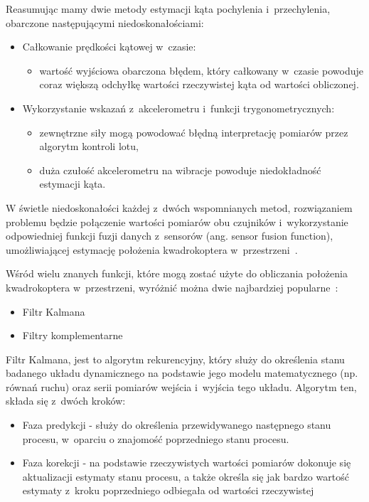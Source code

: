 \documentclass[11pt, twoside]{Thesis} %
\begin{document}
Reasumując mamy dwie metody estymacji kąta pochylenia i~przechylenia, obarczone następującymi niedoskonałościami:

\begin{itemize}
	\item Całkowanie prędkości kątowej w~czasie:
		\begin{itemize}
			\item wartość wyjściowa obarczona błędem, który całkowany w~czasie powoduje coraz większą odchyłkę wartości rzeczywistej kąta od wartości obliczonej.
		\end{itemize}
	\item Wykorzystanie wskazań z~akcelerometru i~funkcji trygonometrycznych:
		\begin{itemize}
			\item zewnętrzne siły mogą powodować błędną interpretację pomiarów przez algorytm kontroli lotu,
			\item duża czułość akcelerometru na wibracje powoduje niedokładność estymacji kąta.
		\end{itemize}
\end{itemize}

W świetle niedoskonałości każdej z~dwóch wspomnianych metod, rozwiązaniem problemu będzie połączenie wartości pomiarów obu czujników i~wykorzystanie odpowiedniej funkcji fuzji danych z~sensorów (ang. sensor fusion function), umożliwiającej estymację położenia kwadrokoptera w~przestrzeni~\cite{filters1}.

Wśród wielu znanych funkcji, które mogą zostać użyte do obliczania położenia kwadrokoptera w~przestrzeni, wyróżnić można dwie najbardziej popularne~\cite{filters1, filters2, filters3}:
\begin{itemize}
	\item Filtr Kalmana
	\item Filtry komplementarne
\end{itemize}

Filtr Kalmana, jest to algorytm rekurencyjny, który służy do określenia stanu badanego układu dynamicznego na podstawie jego modelu matematycznego (np. równań ruchu) oraz serii pomiarów wejścia i~wyjścia tego układu. Algorytm ten, składa się z~dwóch kroków:

\begin{itemize}
	\item Faza predykcji - służy do określenia przewidywanego następnego stanu procesu, w~oparciu o znajomość poprzedniego stanu procesu.
	\item Faza korekcji - na podstawie rzeczywistych wartości pomiarów dokonuje się aktualizacji estymaty stanu procesu, a także określa się jak bardzo wartość estymaty z~kroku poprzedniego odbiegała od wartości rzeczywistej
\end{itemize} 
\end{document}
